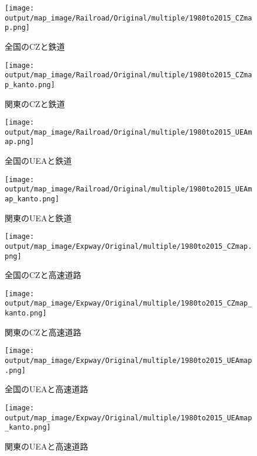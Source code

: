\documentclass{ltjsarticle}
\begin{document}
\begin{figure}[pbth]
  \centering
  \texttt{[image: output/map\_image/Railroad/Original/multiple/1980to2015\_CZmap.png]}
  \caption{\label{allCZandRail}全国のCZと鉄道}
\end{figure}

\begin{figure}[pbth]
  \centering
  \texttt{[image: output/map\_image/Railroad/Original/multiple/1980to2015\_CZmap\_kanto.png]}
  \caption{\label{KanCZandRail}関東のCZと鉄道}
\end{figure}


\begin{figure}[pbth]
  \centering
  \texttt{[image: output/map\_image/Railroad/Original/multiple/1980to2015\_UEAmap.png]}
  \caption{\label{allUEAandRail}全国のUEAと鉄道}
\end{figure}


\begin{figure}[pbth]
  \centering
  \texttt{[image: output/map\_image/Railroad/Original/multiple/1980to2015\_UEAmap\_kanto.png]}
  \caption{\label{KanUEAandRail}関東のUEAと鉄道}
\end{figure}



\begin{figure}[pbth]
  \centering
  \texttt{[image: output/map\_image/Expway/Original/multiple/1980to2015\_CZmap.png]}
  \caption{\label{allCZandExpway}全国のCZと高速道路}
\end{figure}

\begin{figure}[pbth]
  \centering
  \texttt{[image: output/map\_image/Expway/Original/multiple/1980to2015\_CZmap\_kanto.png]}
  \caption{\label{KanCZandExpway}関東のCZと高速道路}
\end{figure}


\begin{figure}[pbth]
  \centering
  \texttt{[image: output/map\_image/Expway/Original/multiple/1980to2015\_UEAmap.png]}
  \caption{\label{allUEAandExpway}全国のUEAと高速道路}
\end{figure}


\begin{figure}[pbth]
  \centering
  \texttt{[image: output/map\_image/Expway/Original/multiple/1980to2015\_UEAmap\_kanto.png]}
  \caption{\label{KanUEAandExpway}関東のUEAと高速道路}
\end{figure}
\end{document}
